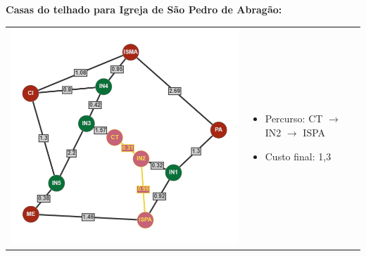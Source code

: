 \documentclass[12pt]{article}
\begin{document}
    \noindent \textbf{Casas do telhado para Igreja de São Pedro de Abragão:}\\
    \begin{tabular}{@{}m{}m{}@{}}
      \centering\includegraphics[scale=0.4]{anexos/CT-ISPA.png} &
      \begin{itemize}
        \item Percurso: CT $\rightarrow$ IN2 $\rightarrow$ ISPA
        \item Custo final: 1,3
      \end{itemize}
    \end{tabular}
    
\end{document}

